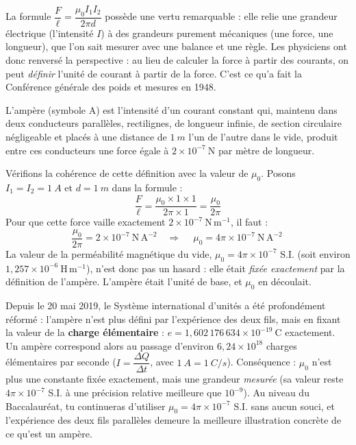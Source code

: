 \documentclass[11pt]{article}
\newcommand{\cle}[1]{{\popxbold\color{popdark}#1}}
\newcounter{popsec}
\newcounter{popsub}
\newcommand{\courssub}[1]{%
  \stepcounter{popsub}%
  \par\vspace{9pt}\noindent{\popxbold\fontsize{11.5}{13}\selectfont\color{popink}{\color{poporange}\thepopsec.\thepopsub}\hspace{6pt}#1}\par\nopagebreak\vspace{4pt}
}
\begin{document}
\courssub{La définition historique de l'ampère}

La formule $\dfrac{F}{\ell} = \dfrac{\mu_0 I_1 I_2}{2\pi d}$ possède une vertu remarquable : elle relie une grandeur électrique (l'intensité $I$) à des grandeurs purement mécaniques (une force, une longueur), que l'on sait mesurer avec une balance et une règle. Les physiciens ont donc renversé la perspective : au lieu de calculer la force à partir des courants, on peut \emph{définir} l'unité de courant à partir de la force. C'est ce qu'a fait la Conférence générale des poids et mesures en 1948.

\begin{definition}
L'\cle{ampère} (symbole A) est l'intensité d'un courant constant qui, maintenu dans deux conducteurs parallèles, rectilignes, de longueur infinie, de section circulaire négligeable et placés à une distance de $\SI{1}{m}$ l'un de l'autre dans le vide, produit entre ces conducteurs une force égale à $2 \times 10^{-7}\ \mathrm{N}$ par mètre de longueur.
\end{definition}

Vérifions la cohérence de cette définition avec la valeur de $\mu_0$. Posons $I_1 = I_2 = \SI{1}{A}$ et $d = \SI{1}{m}$ dans la formule :
\[ \frac{F}{\ell} = \frac{\mu_0 \times 1 \times 1}{2\pi \times 1} = \frac{\mu_0}{2\pi} \]
Pour que cette force vaille exactement $2\times 10^{-7}\ \mathrm{N\,m^{-1}}$, il faut :
\[ \frac{\mu_0}{2\pi} = 2\times 10^{-7}\ \mathrm{N\,A^{-2}} \quad \Longrightarrow \quad \boxed{\ \mu_0 = 4\pi \times 10^{-7}\ \mathrm{N\,A^{-2}}\ } \]
La valeur de la perméabilité magnétique du vide, $\mu_0 = 4\pi \times 10^{-7}$ S.I. (soit environ $1{,}257 \times 10^{-6}\ \mathrm{H\,m^{-1}}$), n'est donc pas un hasard : elle était \emph{fixée exactement} par la définition de l'ampère. L'ampère était l'unité de base, et $\mu_0$ en découlait.

\begin{savaistu}
Depuis le 20 mai 2019, le Système international d'unités a été profondément réformé : l'ampère n'est plus défini par l'expérience des deux fils, mais en fixant la valeur de la \textbf{charge élémentaire} : $e = 1{,}602\,176\,634 \times 10^{-19}\ \mathrm{C}$ exactement. Un ampère correspond alors au passage d'environ $6{,}24 \times 10^{18}$ charges élémentaires par seconde ($I = \dfrac{\Delta Q}{\Delta t}$, avec $\SI{1}{A} = \SI{1}{C/s}$). Conséquence : $\mu_0$ n'est plus une constante fixée exactement, mais une grandeur \emph{mesurée} (sa valeur reste $4\pi \times 10^{-7}$ S.I. à une précision relative meilleure que $10^{-9}$). Au niveau du Baccalauréat, tu continueras d'utiliser $\mu_0 = 4\pi \times 10^{-7}$ S.I. sans aucun souci, et l'expérience des deux fils parallèles demeure la meilleure illustration concrète de ce qu'est un ampère.
\end{savaistu}
\end{document}
